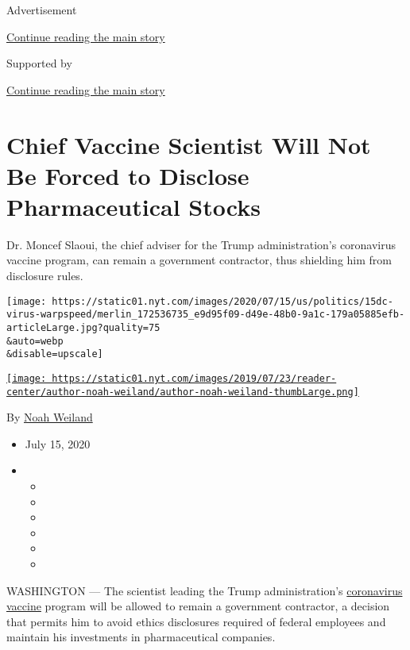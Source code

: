 Advertisement

\protect\hyperlink{after-top}{Continue reading the main story}

Supported by

\protect\hyperlink{after-sponsor}{Continue reading the main story}

\hypertarget{chief-vaccine-scientist-will-not-be-forced-to-disclose-pharmaceutical-stocks}{%
\section{Chief Vaccine Scientist Will Not Be Forced to Disclose
Pharmaceutical
Stocks}\label{chief-vaccine-scientist-will-not-be-forced-to-disclose-pharmaceutical-stocks}}

Dr. Moncef Slaoui, the chief adviser for the Trump administration's
coronavirus vaccine program, can remain a government contractor, thus
shielding him from disclosure rules.

\texttt{[image: https://static01.nyt.com/images/2020/07/15/us/politics/15dc-virus-warpspeed/merlin\_172536735\_e9d95f09-d49e-48b0-9a1c-179a05885efb-articleLarge.jpg?quality=75\\\&auto=webp\\\&disable=upscale]}

\href{https://www.nytimes.com/by/noah-weiland}{\texttt{[image: https://static01.nyt.com/images/2019/07/23/reader-center/author-noah-weiland/author-noah-weiland-thumbLarge.png]}}

By \href{https://www.nytimes.com/by/noah-weiland}{Noah Weiland}

\begin{itemize}
\item
  July 15, 2020
\item
  \begin{itemize}
  \item
  \item
  \item
  \item
  \item
  \item
  \end{itemize}
\end{itemize}

WASHINGTON --- The scientist leading the Trump administration's
\href{https://www.nytimes.com/interactive/2020/science/coronavirus-vaccine-tracker.html}{coronavirus
vaccine} program will be allowed to remain a government contractor, a
decision that permits him to avoid ethics disclosures required of
federal employees and maintain his investments in pharmaceutical
companies.

